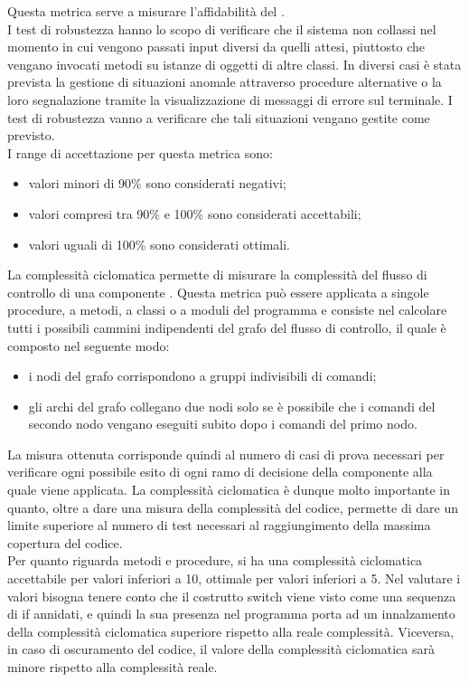 					Questa metrica serve a misurare l'affidabilità del .
					\\I test di robustezza hanno lo scopo di verificare che il sistema non collassi nel momento in cui vengono passati input diversi da quelli attesi, piuttosto che vengano invocati metodi su istanze di oggetti di altre classi. In diversi casi è stata prevista la gestione di situazioni anomale attraverso procedure alternative o la loro segnalazione tramite la visualizzazione di messaggi di errore sul terminale. I test di robustezza vanno a verificare che tali situazioni vengano gestite come previsto.
					\\I range di accettazione per questa metrica sono:
					\begin{itemize}
					\item valori minori di 90\% sono considerati negativi;
					\item valori compresi tra 90\% e 100\% sono considerati accettabili;
					\item valori uguali di 100\% sono considerati ottimali.
					\end{itemize}
				La complessità ciclomatica permette di misurare la complessità del flusso di controllo di una componente . Questa metrica può essere applicata a singole procedure, a metodi, a classi o a moduli del programma e consiste nel calcolare tutti i possibili cammini indipendenti del grafo del flusso di controllo, il quale è composto nel seguente modo:
				\begin{itemize}
					\item i nodi del grafo corrispondono a gruppi indivisibili di comandi;
					\item gli archi del grafo collegano due nodi solo se è possibile che i comandi del secondo nodo vengano eseguiti subito dopo i comandi del primo nodo.
				\end{itemize}
				La misura ottenuta corrisponde quindi al numero di casi di prova necessari per verificare ogni possibile esito di ogni ramo di decisione della componente alla quale viene applicata. La complessità ciclomatica è dunque molto importante in quanto, oltre a dare una misura della complessità del codice, permette di dare un limite superiore al numero di test necessari al raggiungimento della massima copertura del codice.\\
				Per quanto riguarda metodi e procedure, si ha una complessità ciclomatica accettabile per valori inferiori a 10, ottimale per valori inferiori a 5. Nel valutare i valori bisogna tenere conto che il costrutto switch viene visto come una sequenza di if annidati, e quindi la sua presenza nel programma porta ad un innalzamento della complessità ciclomatica superiore rispetto alla reale complessità. Viceversa, in caso di oscuramento del codice, il valore della complessità ciclomatica sarà minore rispetto alla complessità reale.
